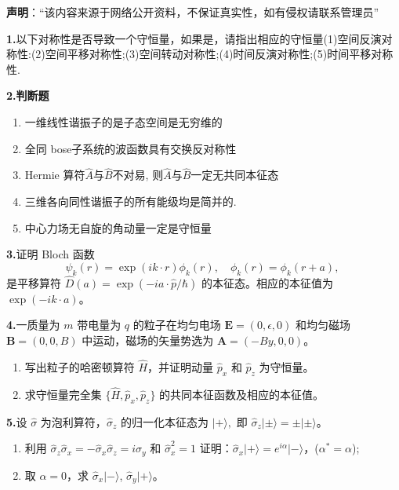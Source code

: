 
\textbf{声明}：“该内容来源于网络公开资料，不保证真实性，如有侵权请联系管理员”

\textbf{1.}以下对称性是否导致一个守恒量，如果是，请指出相应的守恒量(1)空间反演对称性:(2)空间平移对称性;(3)空间转动对称性;(4)时间反演对称性;(5)时间平移对称性.

\textbf{2.判断题}
\begin{enumerate}
\item 一维线性谐振子的是子态空间是无穷维的
\item 全同 bose子系统的波函数具有交换反对称性
\item Hermie 算符$\hat{A}$与$\hat{B}$不对易, 则$\hat{A}$与$\hat{B}$一定无共同本征态
\item 三维各向同性谐振子的所有能级均是简并的.
\item 中心力场无自旋的角动量一定是守恒量
\end{enumerate}

\textbf{3.}证明 Bloch 函数
$$\psi_k(r) = \exp(ik \cdot r)\phi_k(r), \quad \phi_k(r) = \phi_k(r + a),~$$
是平移算符 $\hat{D}(a) = \exp\left(-ia \cdot \hat{p}/\hbar\right)$ 的本征态。相应的本征值为 $\exp(-ik \cdot a)$。

\textbf{4.}一质量为 $m$ 带电量为 $q$ 的粒子在均匀电场 $\mathbf{E} = (0, \epsilon, 0)$ 和均匀磁场 $\mathbf{B} = (0, 0, B)$ 中运动，磁场的矢量势选为 $\mathbf{A} = (-By, 0, 0)$。

\begin{enumerate}
    \item 写出粒子的哈密顿算符 $\hat{H}$，并证明动量 $\hat{p}_x$ 和 $\hat{p}_z$ 为守恒量。
    \item 求守恒量完全集 $\{\hat{H}, \hat{p}_x, \hat{p}_z\}$ 的共同本征函数及相应的本征值。
\end{enumerate}

\textbf{5.}设 $\hat{\sigma}$ 为泡利算符，$\hat{\sigma}_z$ 的归一化本征态为 $\lvert + \rangle,$ 即 $\hat{\sigma}_z \lvert \pm \rangle = \pm \lvert \pm \rangle$。

\begin{enumerate}
    \item  利用 $\hat{\sigma}_z \hat{\sigma}_x = -\hat{\sigma}_x \hat{\sigma}_z = i\hat{\sigma}_y$ 和 $\hat{\sigma}_x^2 = 1$ 证明：$\hat{\sigma}_x \lvert + \rangle = e^{i\alpha}\lvert - \rangle$，($\alpha^* = \alpha$);
    \item  取 $\alpha = 0$，求 $\hat{\sigma}_x \lvert - \rangle$, $\hat{\sigma}_y \lvert + \rangle$。
\end{enumerate}

